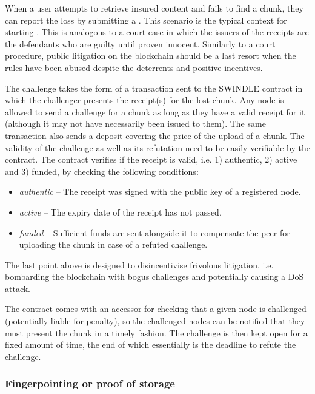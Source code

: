 When a user attempts to retrieve insured content and fails to find a chunk, they can report the loss by submitting a . This scenario is the typical context for starting . This is analogous to a court case in which the issuers of the receipts are the defendants who are guilty until proven innocent. Similarly to a court procedure, public litigation on the blockchain should be a last resort when the rules have been abused despite the deterrents and positive incentives.


The challenge takes the form of a transaction sent to the SWINDLE contract in which the challenger presents the receipt(s) for the lost chunk. Any node is allowed to send a challenge for a chunk as long as they have a valid receipt for it (although it may not have necessarily been issued to them). The same transaction also sends a deposit covering the price of the upload of a chunk. The validity of the challenge as well as its refutation need to be easily verifiable by the contract.
The contract verifies if the receipt is valid, i.e. 1) authentic, 2) active and 3) funded, by checking the following conditions:

\begin{itemize}
\item \emph{authentic} -- The receipt was signed with the public key of a registered node.
\item \emph{active} -- The expiry date of the receipt has not passed.
\item \emph{funded} -- Sufficient funds are sent alongside it to compensate the peer for uploading the chunk in case of a refuted challenge.
\end{itemize}

The last point above is designed to disincentivise frivolous litigation, i.e. bombarding the blockchain with bogus challenges and potentially causing a DoS attack.

The contract comes with an accessor for checking that a given node is challenged (potentially liable for penalty), so the challenged nodes can be notified that they must present the chunk in a timely fashion. The challenge is then kept open for a fixed amount of time, the end of which essentially is the deadline to refute the challenge. 


\subsubsection{Fingerpointing or proof of storage}


